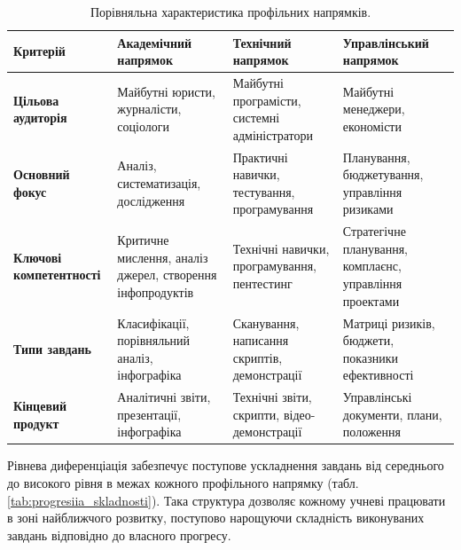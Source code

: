 \begin{table}[h!]
\caption{Порівняльна характеристика профільних напрямків.}
\label{tab:charakterystyka_napriamkiv}
\setlength \tabcolsep {0.5\tabcolsep }
\centering

\begin{tabular}{
  | >{\raggedright\arraybackslash}p{} 
  | >{\raggedright\arraybackslash}p{} 
  | >{\raggedright\arraybackslash}p{} 
  | >{\raggedright\arraybackslash}p{} |
}
\hline
\textbf{Критерій} & \textbf{Академічний напрямок} & \textbf{Технічний напрямок} & \textbf{Управлінський напрямок} \\ \hline

\textbf{Цільова аудиторія} & Майбутні юристи, журналісти, соціологи & Майбутні програмісти, системні адміністратори & Майбутні менеджери, економісти \\ \hline
\textbf{Основний фокус} & Аналіз, систематизація, дослідження & Практичні навички, тестування, програмування & Планування, бюджетування, управління ризиками \\ \hline
\textbf{Ключові компетентності} & Критичне мислення, аналіз джерел, створення інфопродуктів & Технічні навички, програмування, пентестинг & Стратегічне планування, комплаєнс, управління проектами \\ \hline
\textbf{Типи завдань} & Класифікації, порівняльний аналіз, інфографіка & Сканування, написання скриптів, демонстрації & Матриці ризиків, бюджети, показники ефективності \\ \hline
\textbf{Кінцевий продукт} & Аналітичні звіти, презентації, інфографіка & Технічні звіти, скрипти, відео-демонстрації & Управлінські документи, плани, положення \\ \hline
\end{tabular}
\end{table}

Рівнева диференціація забезпечує поступове ускладнення завдань від середнього до високого рівня в межах кожного профільного напрямку (табл. \ref{tab:progresiia_skladnosti}). Така структура дозволяє кожному учневі працювати в зоні найближчого розвитку, поступово нарощуючи складність виконуваних завдань відповідно до власного прогресу.

